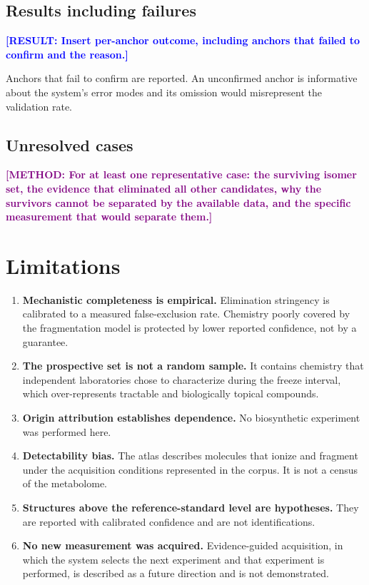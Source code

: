 \documentclass[12pt]{article}
\newcommand{\result}[1]{\textbf{\textcolor{blue}{[RESULT: #1]}}}
\newcommand{\methodtodo}[1]{\textbf{\textcolor{purple}{[METHOD: #1]}}}
\begin{document}
\subsection{Results including failures}
\result{Insert per-anchor outcome, including anchors that failed to confirm and the reason.}

Anchors that fail to confirm are reported. An unconfirmed anchor is informative about the system's error modes and its omission would misrepresent the validation rate.

\subsection{Unresolved cases}
\methodtodo{For at least one representative case: the surviving isomer set, the evidence that eliminated all other candidates, why the survivors cannot be separated by the available data, and the specific measurement that would separate them.}

\section{Limitations}

\begin{enumerate}
\item \textbf{Mechanistic completeness is empirical.} Elimination stringency is calibrated to a measured false-exclusion rate. Chemistry poorly covered by the fragmentation model is protected by lower reported confidence, not by a guarantee.
\item \textbf{The prospective set is not a random sample.} It contains chemistry that independent laboratories chose to characterize during the freeze interval, which over-represents tractable and biologically topical compounds.
\item \textbf{Origin attribution establishes dependence.} No biosynthetic experiment was performed here.
\item \textbf{Detectability bias.} The atlas describes molecules that ionize and fragment under the acquisition conditions represented in the corpus. It is not a census of the metabolome.
\item \textbf{Structures above the reference-standard level are hypotheses.} They are reported with calibrated confidence and are not identifications.
\item \textbf{No new measurement was acquired.} Evidence-guided acquisition, in which the system selects the next experiment and that experiment is performed, is described as a future direction and is not demonstrated.
\end{enumerate}
\end{document}
